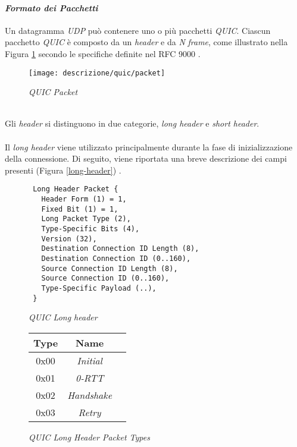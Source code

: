 \paragraph{\textit{Formato dei Pacchetti}}
\noindent Un datagramma \emph{UDP} può contenere uno o più pacchetti \emph{QUIC}. Ciascun pacchetto \emph{QUIC} è composto da un \emph{header} e da \emph{N} \emph{frame}, come illustrato nella Figura \ref{quic-packet} secondo le specifiche definite nel RFC 9000 \cite{site:rfc9000}.
\begin{figure}[!h]
    \centering
    \texttt{[image: descrizione/quic/packet]}
    \caption{\emph{QUIC Packet}}
    \label{quic-packet}
\end{figure}
\\
Gli \emph{header} si distinguono in due categorie, \emph{long header} e \emph{short header}. 
\\\\
Il \emph{long header} viene utilizzato principalmente durante la fase di inizializzazione della connessione. 
Di seguito, viene riportata una breve descrizione dei campi presenti (Figura \ref{long-header}) \cite{site:rfc9000}.
\begin{figure}[!h]
    \centering
    \begin{minipage}{0.48\textwidth}
        \centering
        \begin{small}
        \begin{BVerbatim}
 Long Header Packet {
   Header Form (1) = 1,
   Fixed Bit (1) = 1,
   Long Packet Type (2),
   Type-Specific Bits (4),
   Version (32),
   Destination Connection ID Length (8),
   Destination Connection ID (0..160),
   Source Connection ID Length (8),
   Source Connection ID (0..160),
   Type-Specific Payload (..),
 }
        \end{BVerbatim}
    \end{small}
        \caption{\emph{QUIC Long header}}
        \label{long-header}
    \end{minipage}
    \hfill
    \begin{minipage}{0.48\textwidth}
        \centering
        \begin{tabular}{|c|c|c|}
            \hline
            \textbf{Type} & \textbf{Name}  \\
            \hline
            0x00 & \emph{Initial} \\
            \hline
            0x01 & \emph{0-RTT}  \\
            \hline
            0x02 & \emph{Handshake}   \\
            \hline
            0x03 & \emph{Retry}  \\
            \hline
            \end{tabular}
        \caption{\emph{QUIC Long Header Packet Types}}
        \label{packet-type}
    \end{minipage}
\end{figure}

